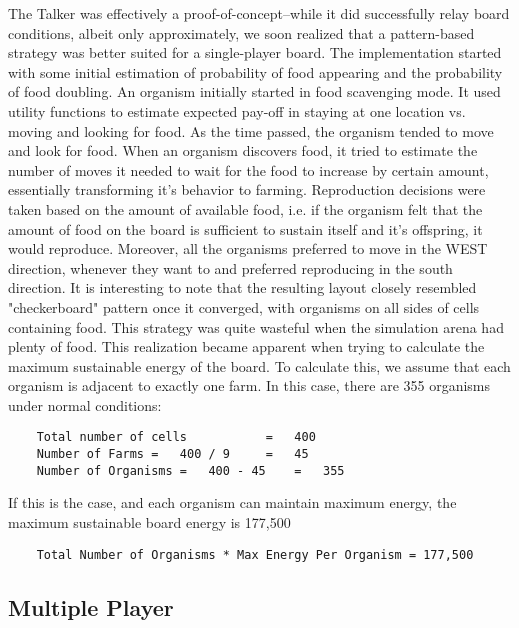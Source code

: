 The Talker was effectively a proof-of-concept--while it did
successfully relay board conditions, albeit only approximately, we
soon realized that a pattern-based strategy was better suited for a
single-player board. The implementation started with some initial
estimation of probability of food appearing and the probability of
food doubling. An organism initially started in food scavenging
mode. It used utility functions to estimate expected pay-off in
staying at one location vs.  moving and looking for food. As the time
passed, the organism tended to move and look for food. When an
organism discovers food, it tried to estimate the number of moves it
needed to wait for the food to increase by certain amount, essentially
transforming it's behavior to farming. Reproduction decisions were
taken based on the amount of available food, i.e. if the organism felt
that the amount of food on the board is sufficient to sustain itself
and it's offspring, it would reproduce.  Moreover, all the organisms
preferred to move in the WEST direction, whenever they want to and
preferred reproducing in the south direction.  It is interesting to
note that the resulting layout closely resembled "checkerboard"
pattern once it converged, with organisms on all sides of cells
containing food. This strategy was quite wasteful when the simulation
arena had plenty of food.  This realization became apparent when
trying to calculate the maximum sustainable energy of the board. To
calculate this, we assume that each organism is adjacent to exactly
one farm.  In this case, there are 355 organisms under normal
conditions:
\begin{verbatim}
	Total number of cells			=	400
	Number of Farms	=	400 / 9 	= 	45
	Number of Organisms = 	400 - 45	= 	355
\end{verbatim}

If this is the case, and each organism can maintain maximum energy, the maximum sustainable board energy is 177,500
\begin{verbatim}
	Total Number of Organisms * Max Energy Per Organism = 177,500
\end{verbatim}





\subsection{Multiple Player}

